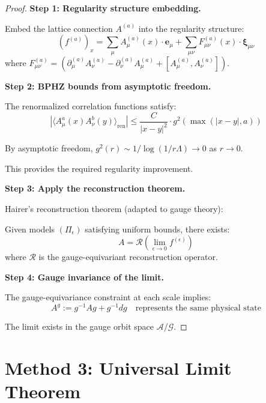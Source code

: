 \begin{proof}
\textbf{Step 1: Regularity structure embedding.}

Embed the lattice connection $A^{(a)}$ into the regularity structure:
\begin{equation}
(f^{(a)})_x = \sum_{\mu} A_\mu^{(a)}(x) \cdot \mathbf{e}_\mu + \sum_{\mu\nu} F_{\mu\nu}^{(a)}(x) \cdot \boldsymbol{\xi}_{\mu\nu}
\end{equation}
where $F_{\mu\nu}^{(a)} = (\partial_\mu^{(a)} A_\nu^{(a)} - \partial_\nu^{(a)} A_\mu^{(a)} + [A_\mu^{(a)}, A_\nu^{(a)}])$.

\textbf{Step 2: BPHZ bounds from asymptotic freedom.}

The renormalized correlation functions satisfy:
\begin{equation}
|\langle A_\mu^a(x) A_\nu^b(y) \rangle_{\text{ren}}| \leq \frac{C}{|x-y|^2} \cdot g^2(\max(|x-y|, a))
\end{equation}

By asymptotic freedom, $g^2(r) \sim 1/\log(1/r\Lambda) \to 0$ as $r \to 0$.

This provides the required regularity improvement.

\textbf{Step 3: Apply the reconstruction theorem.}

Hairer's reconstruction theorem (adapted to gauge theory):

Given models $(\Pi_\epsilon)$ satisfying uniform bounds, there exists:
\begin{equation}
A = \mathcal{R}(\lim_{\epsilon \to 0} f^{(\epsilon)})
\end{equation}
where $\mathcal{R}$ is the gauge-equivariant reconstruction operator.

\textbf{Step 4: Gauge invariance of the limit.}

The gauge-equivariance constraint at each scale implies:
\begin{equation}
A^g := g^{-1} A g + g^{-1} dg \quad \text{represents the same physical state}
\end{equation}

The limit exists in the gauge orbit space $\mathcal{A}/\mathcal{G}$.
\end{proof}

\section{Method 3: Universal Limit Theorem}
\label{subsec:universal-limit}

